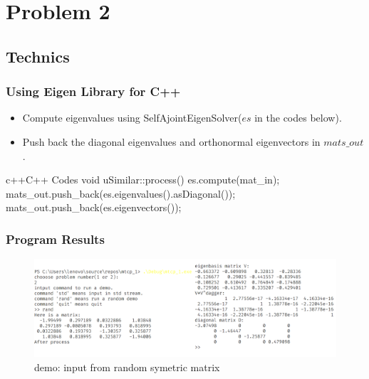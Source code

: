 \section{Problem 2}
\subsection{Technics}

    \begin{frame}[fragile]
        \frametitle{Using Eigen Library for C++}

        \begin{itemize}
            \item Compute eigenvalues using SelfAjointEigenSolver(\(es\) in the codes below).
            \item Push back the diagonal eigenvalues and orthonormal eigenvectors in \(mats\_out\).
        \end{itemize}

\begin{codeblock}{c++}{C++ Codes}
void uSimilar::process()
{
    es.compute(mat_in);
    mats_out.push_back(es.eigenvalues().asDiagonal());
    mats_out.push_back(es.eigenvectors());
}
        \end{codeblock}
    \end{frame}

    \begin{frame}
    \frametitle{Program Results}
    
    \begin{figure}
        \centering
        \includegraphics[width = 1.7\textheight]{img/result2.png}
        \caption{demo: input from random symetric matrix}
    \end{figure}
\end{frame}
